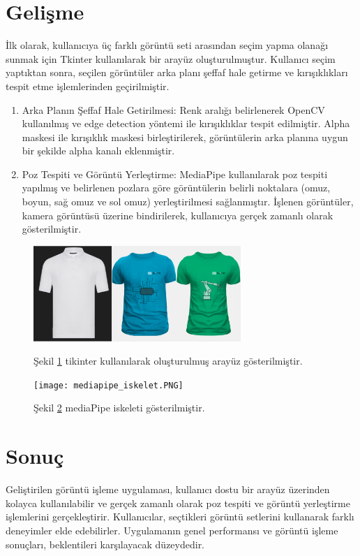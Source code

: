 \documentclass[12pt, a4paper]{article}
\begin{document}
\section{Gelişme}
İlk olarak, kullanıcıya üç farklı görüntü seti arasından seçim yapma olanağı sunmak için Tkinter kullanılarak bir arayüz oluşturulmuştur. Kullanıcı seçim yaptıktan sonra, seçilen görüntüler arka planı şeffaf hale getirme ve kırışıklıkları tespit etme işlemlerinden geçirilmiştir\cite{ChatGPT3.5}.
	\begin{enumerate}
\item Arka Planın Şeffaf Hale Getirilmesi: Renk aralığı belirlenerek OpenCV kullanılmış ve edge detection yöntemi ile kırışıklıklar tespit edilmiştir. Alpha maskesi ile kırışıklık maskesi birleştirilerek, görüntülerin arka planına uygun bir şekilde alpha kanalı eklenmiştir.

\item Poz Tespiti ve Görüntü Yerleştirme: MediaPipe kullanılarak poz tespiti yapılmış ve belirlenen pozlara göre görüntülerin belirli noktalara (omuz, boyun, sağ omuz ve sol omuz) yerleştirilmesi sağlanmıştır. İşlenen görüntüler, kamera görüntüsü üzerine bindirilerek, kullanıcıya gerçek zamanlı olarak gösterilmiştir.
\end{enumerate}
	\begin{figure}[!ht]
	\caption{}
	\centering
	\includegraphics[width=0.7\textwidth]{Tkinter.PNG}
	\label{tikinter}
	
	
	Şekil \ref{tikinter} tikinter kullanılarak oluşturulmuş arayüz gösterilmiştir\cite{MediapipeGithubb}.	
	
	
	
\end{figure}
\begin{figure}[!ht]
	\caption{}
	\centering
	\texttt{[image: mediapipe\_iskelet.PNG]}
	\label{iskeletm}
	
	
	Şekil \ref{iskeletm} mediaPipe iskeleti gösterilmiştir\cite{MediapipeGithubb}.	
	
	
	
\end{figure}
\newpage

\section{Sonuç}
Geliştirilen görüntü işleme uygulaması, kullanıcı dostu bir arayüz üzerinden kolayca kullanılabilir ve gerçek zamanlı olarak poz tespiti ve görüntü yerleştirme işlemlerini gerçekleştirir. Kullanıcılar, seçtikleri görüntü setlerini kullanarak farklı deneyimler elde edebilirler. Uygulamanın genel performansı ve görüntü işleme sonuçları, beklentileri karşılayacak düzeydedir.
\newpage
	
	 
	
	
	
\end{document}
